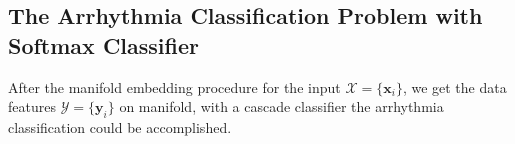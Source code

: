 \documentclass[journal]{IEEEtran}
\begin{document}




%
%

\subsection{The Arrhythmia Classification Problem with Softmax Classifier}
After the manifold embedding procedure for the input $\mathcal{X} = \{\bm{x}_i\}$, we get the data features  $\mathcal{Y} = \{\bm{y}_i\}$ on manifold, with a cascade classifier the arrhythmia classification could be accomplished.
\end{document}
